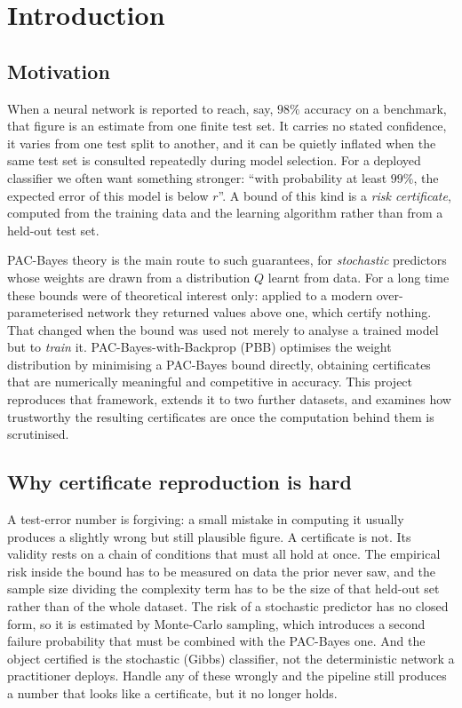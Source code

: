 \section{Introduction}\label{sec:intro}

\subsection{Motivation}\label{sec:motivation}

When a neural network is reported to reach, say, $98\%$ accuracy on a benchmark,
that figure is an estimate from one finite test set. It carries no stated
confidence, it varies from one test split to another, and it can be quietly
inflated when the same test set is consulted repeatedly during model selection.
For a deployed classifier we often want something stronger: ``with probability
at least $99\%$, the expected error of this model is below $r$''. A bound of this
kind is a \emph{risk certificate}, computed from the training data and the
learning algorithm rather than from a held-out test set.

PAC-Bayes theory \parencite{mcallester1999,seeger2002,catoni2007} is the main
route to such guarantees, for \emph{stochastic} predictors whose weights are
drawn from a distribution $Q$ learnt from data.
For a long time these bounds were of theoretical interest only: applied to a
modern over-parameterised network they returned values above one, which certify
nothing. That changed when the bound was used not merely to analyse a
trained model but to \emph{train} it. PAC-Bayes-with-Backprop (PBB)
\parencite{perezortiz2021} optimises the weight distribution by minimising a
PAC-Bayes bound directly, obtaining certificates that are numerically meaningful
and competitive in accuracy. This project reproduces that framework,
extends it to two further datasets, and examines how trustworthy the resulting
certificates are once the computation behind them is scrutinised.

\subsection{Why certificate reproduction is hard}\label{sec:problem}

A test-error number is forgiving: a small mistake in computing it usually produces
a slightly wrong but still plausible figure. A certificate is not. Its validity
rests on a chain of conditions that must all hold at once. The empirical risk
inside the bound has to be measured on data the prior never saw, and the sample
size dividing the complexity term has to be the size of that held-out set rather
than of the whole dataset. The risk of a stochastic predictor has no closed form,
so it is estimated by Monte-Carlo sampling, which introduces a second failure
probability that must be combined with the PAC-Bayes one. And the object certified
is the stochastic (Gibbs) classifier, not the deterministic network a practitioner
deploys. Handle any of these wrongly and the pipeline still produces a number that
looks like a certificate, but it no longer holds.

